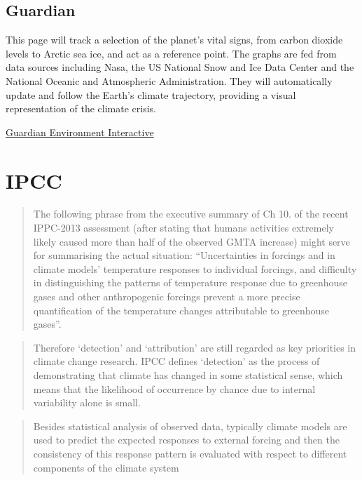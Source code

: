 \documentclass[
]{book}
\begin{document}
\hypertarget{guardian}{%
\section{Guardian}\label{guardian}}

This page will track a selection of the planet's vital signs, from carbon dioxide levels to Arctic sea ice, and act as a reference point. The graphs are fed from data sources including Nasa, the US National Snow and Ice Data Center and the National Oceanic and Atmospheric Administration. They will automatically update and follow the Earth's climate trajectory, providing a visual representation of the climate crisis.

\href{https://www.theguardian.com/environment/ng-interactive/2020/oct/05/climate-data-dashboard-carbon-atmosphere-sea-level-arctic-ice}{Guardian Environment Interactive}

\hypertarget{ipcc}{%
\chapter{IPCC}\label{ipcc}}

\begin{quote}
The following phrase from the executive summary of Ch 10. of
the recent IPPC-2013 assessment (after stating that humans activities
extremely likely caused more than half of the observed GMTA increase)
might serve for summarising the actual situation:
``Uncertainties in forcings and in climate models' temperature responses
to individual forcings, and difficulty in distinguishing the patterns of
temperature response due to greenhouse gases and other anthropogenic
forcings prevent a more precise quantification of the temperature changes
attributable to greenhouse gases''.
\end{quote}

\begin{quote}
Therefore `detection' and `attribution' are still regarded as key
priorities in climate change research. IPCC defines `detection' as
the process of demonstrating that climate has changed in some statistical
sense, which means that the likelihood of occurrence by chance due to
internal variability alone is small.
\end{quote}

\begin{quote}
Besides statistical analysis of observed data, typically climate models
are used to predict the expected responses to external forcing and then
the consistency of this response pattern is evaluated with respect to
different components of the climate system
\end{quote}
\end{document}
